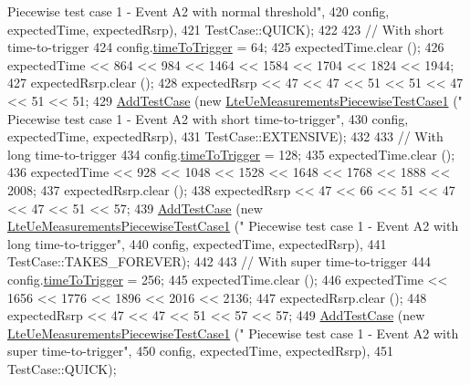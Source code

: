 \begin{DoxyCode}
{      Piecewise test case 1 - Event A2 with normal threshold"},
420                                                         config, expectedTime, expectedRsrp),
421                TestCase::QUICK);
422 
423   \textcolor{comment}{// With short time-to-trigger}
424   config.\hyperlink{structns3_1_1LteRrcSap_1_1ReportConfigEutra_aee64b76b166b1beda5bbe1760363ed24}{timeToTrigger} = 64;
425   expectedTime.clear ();
426   expectedTime << 864 << 984 << 1464 << 1584 << 1704 << 1824 << 1944;
427   expectedRsrp.clear ();
428   expectedRsrp << 47 << 47 << 51 << 51 << 47 << 51 << 51;
429   \hyperlink{classns3_1_1TestCase_a3718088e3eefd5d6454569d2e0ddd835}{AddTestCase} (\textcolor{keyword}{new} \hyperlink{classLteUeMeasurementsPiecewiseTestCase1}{LteUeMeasurementsPiecewiseTestCase1} (\textcolor{stringliteral}{"
      Piecewise test case 1 - Event A2 with short time-to-trigger"},
430                                                         config, expectedTime, expectedRsrp),
431                TestCase::EXTENSIVE);
432 
433   \textcolor{comment}{// With long time-to-trigger}
434   config.\hyperlink{structns3_1_1LteRrcSap_1_1ReportConfigEutra_aee64b76b166b1beda5bbe1760363ed24}{timeToTrigger} = 128;
435   expectedTime.clear ();
436   expectedTime << 928 << 1048 << 1528 << 1648 << 1768 << 1888 << 2008;
437   expectedRsrp.clear ();
438   expectedRsrp << 47 << 66 << 51 << 47 << 47 << 51 << 57;
439   \hyperlink{classns3_1_1TestCase_a3718088e3eefd5d6454569d2e0ddd835}{AddTestCase} (\textcolor{keyword}{new} \hyperlink{classLteUeMeasurementsPiecewiseTestCase1}{LteUeMeasurementsPiecewiseTestCase1} (\textcolor{stringliteral}{"
      Piecewise test case 1 - Event A2 with long time-to-trigger"},
440                                                         config, expectedTime, expectedRsrp),
441                TestCase::TAKES\_FOREVER);
442 
443   \textcolor{comment}{// With super time-to-trigger}
444   config.\hyperlink{structns3_1_1LteRrcSap_1_1ReportConfigEutra_aee64b76b166b1beda5bbe1760363ed24}{timeToTrigger} = 256;
445   expectedTime.clear ();
446   expectedTime << 1656 << 1776 << 1896 << 2016 << 2136;
447   expectedRsrp.clear ();
448   expectedRsrp << 47 << 47 << 51 << 57 << 57;
449   \hyperlink{classns3_1_1TestCase_a3718088e3eefd5d6454569d2e0ddd835}{AddTestCase} (\textcolor{keyword}{new} \hyperlink{classLteUeMeasurementsPiecewiseTestCase1}{LteUeMeasurementsPiecewiseTestCase1} (\textcolor{stringliteral}{"
      Piecewise test case 1 - Event A2 with super time-to-trigger"},
450                                                         config, expectedTime, expectedRsrp),
451                TestCase::QUICK);

\end{DoxyCode}
